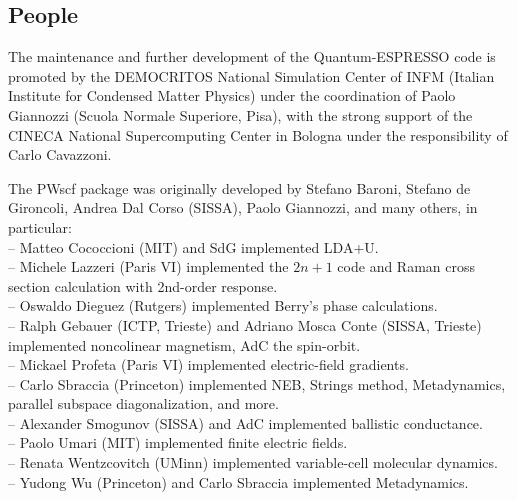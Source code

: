 \documentclass[12pt,a4paper]{article}
\begin{document}
\subsection{People}

The maintenance and further development of the Quantum-ESPRESSO code is
promoted by the DEMOCRITOS National Simulation Center of INFM (Italian
Institute for Condensed Matter Physics) under the coordination of
Paolo Giannozzi (Scuola Normale Superiore, Pisa), with the strong
support of the CINECA National Supercomputing Center in Bologna under
the responsibility of Carlo Cavazzoni.

The PWscf package was originally developed by Stefano Baroni, Stefano
de Gironcoli, Andrea Dal Corso (SISSA), Paolo Giannozzi, and many
others, in particular:\\
-- Matteo Cococcioni (MIT) and SdG implemented LDA+U. \\
-- Michele Lazzeri (Paris VI) implemented the $2n+1$ code and Raman cross
section calculation with 2nd-order response.\\
-- Oswaldo Dieguez (Rutgers) implemented Berry's phase calculations.\\
-- Ralph Gebauer (ICTP, Trieste) and Adriano Mosca Conte (SISSA, Trieste) 
implemented noncolinear magnetism, AdC the spin-orbit.\\
-- Mickael Profeta (Paris VI) implemented electric-field gradients.\\
-- Carlo Sbraccia (Princeton) implemented NEB, Strings method, Metadynamics,
parallel subspace diagonalization, and more.\\
-- Alexander Smogunov (SISSA) and AdC implemented ballistic conductance.\\
-- Paolo Umari (MIT) implemented finite electric fields.\\
-- Renata Wentzcovitch (UMinn) implemented variable-cell molecular dynamics.\\
-- Yudong Wu (Princeton) and Carlo Sbraccia implemented Metadynamics.
\end{document}
